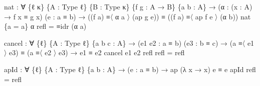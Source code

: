 \documentclass[
  11pt,
  oneside,
  article]{memoir}
\newenvironment{Shaded}{}{}
\newcommand{\NormalTok}[1]{#1}
\newcommand{\OtherTok}[1]{\textcolor[rgb]{0.00,0.44,0.13}{#1}}
\theoremstyle{definition}
\theoremstyle{plain}
\newcommand{\0}{\textsf{0}}
\newcommand{\1}{\tn{\textsf{1}}}
\begin{document}
\begin{Shaded}
\begin{Highlighting}[]
\NormalTok{nat }\OtherTok{:} \OtherTok{∀} \OtherTok{\{}\NormalTok{ℓ κ}\OtherTok{\}} \OtherTok{\{}\NormalTok{A }\OtherTok{:}\NormalTok{ Type ℓ}\OtherTok{\}} \OtherTok{\{}\NormalTok{B }\OtherTok{:}\NormalTok{ Type κ}\OtherTok{\}} \OtherTok{\{}\NormalTok{f g }\OtherTok{:}\NormalTok{ A }\OtherTok{→}\NormalTok{ B}\OtherTok{\}} \OtherTok{\{}\NormalTok{a b }\OtherTok{:}\NormalTok{ A}\OtherTok{\}}
      \OtherTok{→} \OtherTok{(}\NormalTok{α }\OtherTok{:} \OtherTok{(}\NormalTok{x }\OtherTok{:}\NormalTok{ A}\OtherTok{)} \OtherTok{→}\NormalTok{ f x ≡ g x}\OtherTok{)} \OtherTok{(}\NormalTok{e }\OtherTok{:}\NormalTok{ a ≡ b}\OtherTok{)}
      \OtherTok{→} \OtherTok{((}\NormalTok{f a}\OtherTok{)}\NormalTok{ ≡〈 α a 〉 }\OtherTok{(}\NormalTok{ap g e}\OtherTok{))}\NormalTok{ ≡ }\OtherTok{((}\NormalTok{f a}\OtherTok{)}\NormalTok{ ≡〈 ap f e 〉 }\OtherTok{(}\NormalTok{α b}\OtherTok{))}
\NormalTok{nat }\OtherTok{\{}\NormalTok{a }\OtherTok{=}\NormalTok{ a}\OtherTok{\}}\NormalTok{ α refl }\OtherTok{=}\NormalTok{ ≡idr }\OtherTok{(}\NormalTok{α a}\OtherTok{)}

\NormalTok{cancel }\OtherTok{:} \OtherTok{∀} \OtherTok{\{}\NormalTok{ℓ}\OtherTok{\}} \OtherTok{\{}\NormalTok{A }\OtherTok{:}\NormalTok{ Type ℓ}\OtherTok{\}} \OtherTok{\{}\NormalTok{a b c }\OtherTok{:}\NormalTok{ A}\OtherTok{\}}
         \OtherTok{→} \OtherTok{(}\NormalTok{e1 e2 }\OtherTok{:}\NormalTok{ a ≡ b}\OtherTok{)} \OtherTok{(}\NormalTok{e3 }\OtherTok{:}\NormalTok{ b ≡ c}\OtherTok{)}
         \OtherTok{→} \OtherTok{(}\NormalTok{a ≡〈 e1 〉 e3}\OtherTok{)}\NormalTok{ ≡ }\OtherTok{(}\NormalTok{a ≡〈 e2 〉 e3}\OtherTok{)}
         \OtherTok{→}\NormalTok{ e1 ≡ e2}
\NormalTok{cancel e1 e2 refl refl }\OtherTok{=}\NormalTok{ refl}

\NormalTok{apId }\OtherTok{:} \OtherTok{∀} \OtherTok{\{}\NormalTok{ℓ}\OtherTok{\}} \OtherTok{\{}\NormalTok{A }\OtherTok{:}\NormalTok{ Type ℓ}\OtherTok{\}} \OtherTok{\{}\NormalTok{a b }\OtherTok{:}\NormalTok{ A}\OtherTok{\}}
       \OtherTok{→} \OtherTok{(}\NormalTok{e }\OtherTok{:}\NormalTok{ a ≡ b}\OtherTok{)} \OtherTok{→}\NormalTok{ ap }\OtherTok{(λ}\NormalTok{ x }\OtherTok{→}\NormalTok{ x}\OtherTok{)}\NormalTok{ e ≡ e}
\NormalTok{apId refl }\OtherTok{=}\NormalTok{ refl}


\end{Highlighting}
\end{Shaded}
\end{document}
